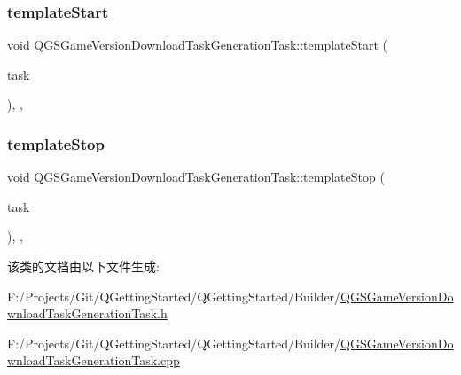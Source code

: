 \mbox{\label{class_q_g_s_game_version_download_task_generation_task_a183fcef1c1dd17f45a7db81ab5758e9c}} 
\subsubsection{\texorpdfstring{template\+Start}{templateStart}}
{\footnotesize\ttfamily void Q\+G\+S\+Game\+Version\+Download\+Task\+Generation\+Task\+::template\+Start (\begin{DoxyParamCaption}\item[{\mbox{\hyperlink{class_q_g_s_task}{Q\+G\+S\+Task}} $\ast$}]{task }\end{DoxyParamCaption})\hspace{0.3cm}{\ttfamily [protected]}, {\ttfamily [virtual]}, {\ttfamily [slot]}}

\mbox{\label{class_q_g_s_game_version_download_task_generation_task_aa73d5a2f7aa252628d61269e71e17bf5}} 
\subsubsection{\texorpdfstring{template\+Stop}{templateStop}}
{\footnotesize\ttfamily void Q\+G\+S\+Game\+Version\+Download\+Task\+Generation\+Task\+::template\+Stop (\begin{DoxyParamCaption}\item[{\mbox{\hyperlink{class_q_g_s_task}{Q\+G\+S\+Task}} $\ast$}]{task }\end{DoxyParamCaption})\hspace{0.3cm}{\ttfamily [protected]}, {\ttfamily [virtual]}, {\ttfamily [slot]}}



该类的文档由以下文件生成\+:\begin{DoxyCompactItemize}
\item 
F\+:/\+Projects/\+Git/\+Q\+Getting\+Started/\+Q\+Getting\+Started/\+Builder/\mbox{\hyperlink{_q_g_s_game_version_download_task_generation_task_8h}{Q\+G\+S\+Game\+Version\+Download\+Task\+Generation\+Task.\+h}}\item 
F\+:/\+Projects/\+Git/\+Q\+Getting\+Started/\+Q\+Getting\+Started/\+Builder/\mbox{\hyperlink{_q_g_s_game_version_download_task_generation_task_8cpp}{Q\+G\+S\+Game\+Version\+Download\+Task\+Generation\+Task.\+cpp}}\end{DoxyCompactItemize}
